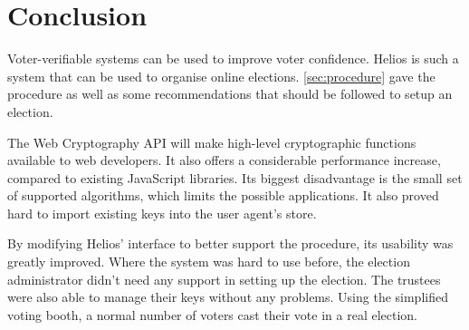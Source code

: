 % 
%

\section{Conclusion}

Voter-verifiable systems can be used to improve voter confidence. Helios is such a system that can be used to organise online elections. \ref{sec:procedure} gave the procedure as well as some recommendations that should be followed to setup an election.

\par The Web Cryptography API will make high-level cryptographic functions available to web developers. It also offers a considerable performance increase, compared to existing JavaScript libraries. Its biggest disadvantage is the small set of supported algorithms, which limits the possible applications. It also proved hard to import existing keys into the user agent's store.

\par By modifying Helios' interface to better support the procedure, its usability was greatly improved. Where the system was hard to use before, the election administrator didn't need any support in setting up the election. The trustees were also able to manage their keys without any problems. Using the simplified voting booth, a normal number of voters cast their vote in a real election.